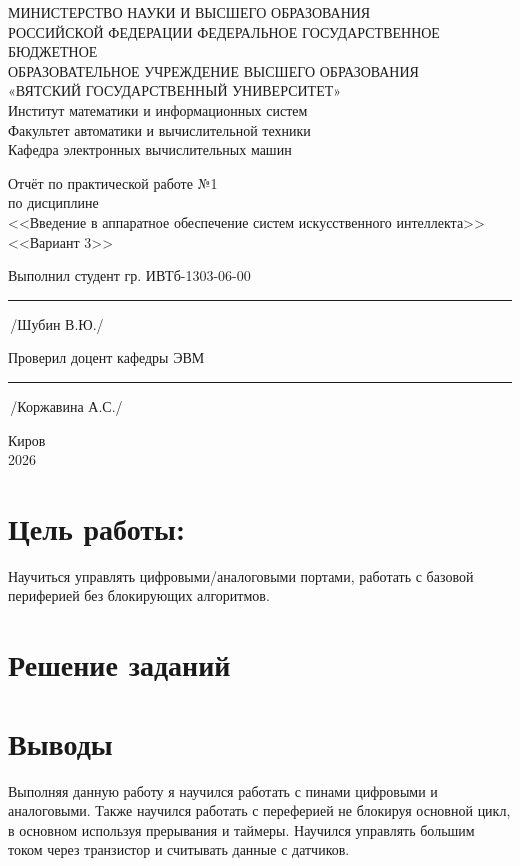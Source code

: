 \documentclass[oneside,a4paper,14pt]{extarticle} %
\begin{document}
	\newpage\thispagestyle{empty}
	\begin{center}
		МИНИСТЕРСТВО НАУКИ И ВЫСШЕГО ОБРАЗОВАНИЯ\\
		РОССИЙСКОЙ ФЕДЕРАЦИИ
		ФЕДЕРАЛЬНОЕ ГОСУДАРСТВЕННОЕ БЮДЖЕТНОЕ\\
		ОБРАЗОВАТЕЛЬНОЕ
		УЧРЕЖДЕНИЕ ВЫСШЕГО ОБРАЗОВАНИЯ\\
		«ВЯТСКИЙ ГОСУДАРСТВЕННЫЙ УНИВЕРСИТЕТ»\\
		Институт математики и информационных систем\\
		Факультет автоматики и вычислительной техники\\
		Кафедра электронных вычислительных машин
	\end{center}
	\vspace{20mm}
	
	\begin{center}
		Отчёт по практической работе №1\\
		по дисциплине\\
		<<Введение в аппаратное обеспечение систем искусственного интеллекта>>\\
		<<Вариант 3>>\\
	\end{center}
	\vspace{48mm}
	
	Выполнил студент гр. ИВТб-1303-06-00 \hspace{10mm} \rule[-0,5mm]{23mm}{0.15mm}\,/Шубин В.Ю./
	
	
	Проверил доцент кафедры ЭВМ \hfill  \rule[-0,5mm]{30mm}{0.15mm}\,/Коржавина А.С./
	
	\vfill
	\begin{center}
		Киров\\
		2026
	\end{center}
	
	\newpage%
	
	\section*{Цель работы:} Научиться управлять цифровыми/аналоговыми портами, работать с базовой периферией без блокирующих алгоритмов.
	
	
	\section*{Решение заданий}
	
	
	\section*{Выводы} Выполняя данную работу я научился работать с пинами цифровыми и аналоговыми. Также научился работать с переферией не блокируя основной цикл, в основном используя прерывания и таймеры. Научился управлять большим током через транзистор и считывать данные с датчиков.
\end{document}
